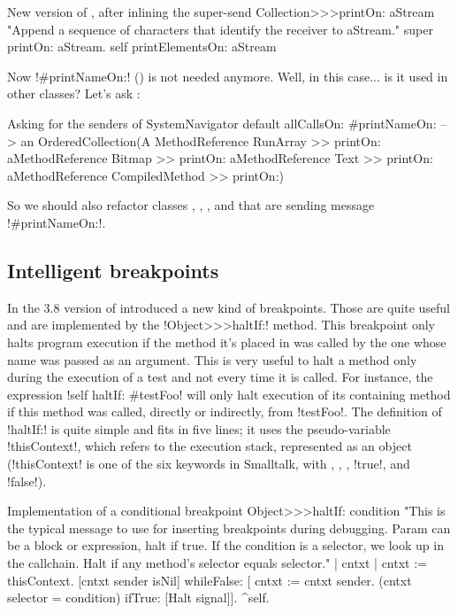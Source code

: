 \documentclass[a4paper,10pt,twoside]{book}
\begin{document}
\begin{method}[newPrintOn]{New version of , after inlining the  super-send}
Collection>>>printOn: aStream
	"Append a sequence of characters that identify the receiver to aStream."
	super printOn: aStream.
	self printElementsOn: aStream
\end{method}

Now \ct!#printNameOn:! () is not needed anymore. Well, in this case... is it used in other classes? Let's ask \squeak:
\begin{example}[sendersofprintnameon]{Asking for the senders of }{}
SystemNavigator default allCallsOn: #printNameOn:
--> an OrderedCollection(A MethodReference RunArray >> printOn: aMethodReference Bitmap >> printOn: aMethodReference Text >> printOn: aMethodReference CompiledMethod >> printOn:)
\end{example}

So we should also refactor classes , , , and  that are sending message \ct!#printNameOn:!.

\subsection{Intelligent breakpoints}

In the 3.8 version of \squeak introduced a new kind of breakpoints.
Those are quite useful and are implemented by the \ct!Object>>>haltIf:! method.
This breakpoint only halts program execution if the method it's placed in was called by the one whose name was passed as an argument.
This is very useful to halt a method only during the execution of a test and not every time it is called.
For instance, the expression \ct!self haltIf: #testFoo! will only halt execution of its containing method if this method was called, directly or indirectly, from \ct!testFoo!.
The definition of \ct!haltIf:! is quite simple and fits in five lines; it uses the pseudo-variable \ct!thisContext!, which refers to the execution stack, represented as an object (\ct!thisContext! is one of the six keywords in Smalltalk, with \self, \super, \nil, \ct!true!, and \ct!false!).

\begin{method}[objecthaltif]{Implementation of a conditional breakpoint}
Object>>>haltIf: condition
	"This is the typical message to use for inserting breakpoints during debugging. Param can be a block or expression, halt if true.
	If the condition is a selector, we look up in the callchain. Halt if any method's selector equals selector."
	| cntxt |
	cntxt := thisContext.
	[cntxt sender isNil] whileFalse: [
		cntxt := cntxt sender.
		(cntxt selector = condition) ifTrue: [Halt signal]].
	^self.
\end{method}
\end{document}
